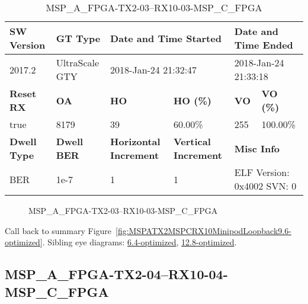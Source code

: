 \begin{table}[h]
\centering
\caption{MSP\_A\_FPGA-TX2-03--RX10-03-MSP\_C\_FPGA}
\label{tab:MSPAFPGATX203RX1003MSPCFPGA9.6-optimized}
\begin{tabular}{@{}|l|l|l|l|l|l|@{}}
\toprule
\textbf{SW Version}                & \textbf{GT Type}   & \multicolumn{2}{l|}{\textbf{Date and Time Started}}            & \multicolumn{2}{l|}{\textbf{Date and Time Ended}}        \\ \midrule
2017.2                       & UltraScale GTY          & \multicolumn{2}{l|}{2018-Jan-24 21:32:47}                   & \multicolumn{2}{l|}{2018-Jan-24 21:33:18}               \\ \midrule
\textbf{Reset RX}                  & \textbf{OA} & \textbf{HO}   & \textbf{HO (\%)} & \textbf{VO} & \textbf{VO (\%)} \\ \midrule
true & 8179        & 39          & 60.00\%        & 255        & 100.00\%       \\ \midrule
\textbf{Dwell Type}                & \textbf{Dwell BER} & \textbf{Horizontal Increment} & \textbf{Vertical Increment}    & \multicolumn{2}{l|}{\textbf{Misc Info}}                  \\ \midrule
BER                            & 1e-7        & 1        & 1           & \multicolumn{2}{l|}{ELF Version: 0x4002 SVN: 0}                         \\ \bottomrule
\end{tabular}
\end{table}

\begin{figure}[h]
\caption{MSP\_A\_FPGA-TX2-03--RX10-03-MSP\_C\_FPGA} \label{fig:MSPAFPGATX203RX1003MSPCFPGA9.6-optimized}
\end{figure}

Call back to summary Figure~\ref{fig:MSPATX2MSPCRX10MinipodLoopback9.6-optimized}.
Sibling eye diagrams: \hyperref[sec:MSPAFPGATX203RX1003MSPCFPGA6.4-optimized]{6.4-optimized}, \hyperref[sec:MSPAFPGATX203RX1003MSPCFPGA12.8-optimized]{12.8-optimized}.

\clearpage
\newpage


\subsection{MSP\_A\_FPGA-TX2-04--RX10-04-MSP\_C\_FPGA}\label{sec:MSPAFPGATX204RX1004MSPCFPGA9.6-optimized}

